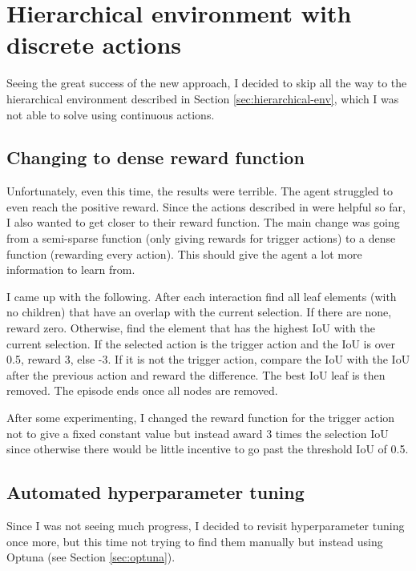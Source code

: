 \documentclass[
  digital,     %
  oneside,     %
  nosansbold,  %
  nocolorbold, %
  lof,         %
  lot,         %
]{fithesis4}
\begin{document}
\section{Hierarchical environment with discrete actions}

Seeing the great success of the new approach, I decided to skip all the way to the hierarchical environment described in Section \ref{sec:hierarchical-env}, which I was not able to solve using continuous actions.

\subsection{Changing to dense reward function}

Unfortunately, even this time, the results were terrible. The agent struggled to even reach the positive reward. Since the actions described in \cite{iterative_od_with_rl} were helpful so far, I also wanted to get closer to their reward function. The main change was going from a semi-sparse function (only giving rewards for trigger actions) to a dense function (rewarding every action). This should give the agent a lot more information to learn from.

I came up with the following. After each interaction find all leaf elements (with no children) that have an overlap with the current selection. If there are none, reward zero. Otherwise, find the element that has the highest IoU with the current selection. If the selected action is the trigger action and the IoU is over 0.5, reward 3, else -3. If it is not the trigger action, compare the IoU with the IoU after the previous action and reward the difference. The best IoU leaf is then removed. The episode ends once all nodes are removed.

After some experimenting, I changed the reward function for the trigger action not to give a fixed constant value but instead award 3 times the selection IoU since otherwise there would be little incentive to go past the threshold IoU of 0.5.

\subsection{Automated hyperparameter tuning}

Since I was not seeing much progress, I decided to revisit hyperparameter tuning once more, but this time not trying to find them manually but instead using Optuna (see Section \ref{sec:optuna}).
\end{document}
